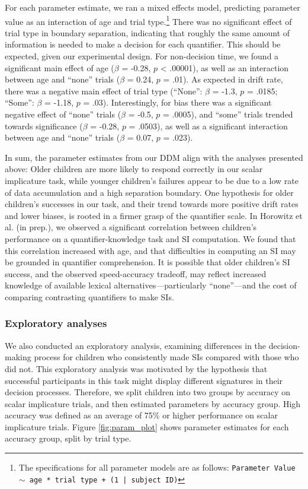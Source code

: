 \documentclass[10pt, letterpaper]{article}
\begin{document}
For each parameter estimate, we ran a mixed effects model, predicting
parameter value as an interaction of age and trial
type.\footnote{The specifications for all parameter models are as follows: \texttt{Parameter Value $\sim$ age * trial type + (1 | subject ID)}}
There was no significant effect of trial type in boundary separation,
indicating that roughly the same amount of information is needed to make
a decision for each quantifier. This should be expected, given our
experimental design. For non-decision time, we found a significant main
effect of age (\(\beta\) = -0.28, \(p\) \textless{} .00001), as well as
an interaction between age and ``none'' trials (\(\beta\) = 0.24, \(p\)
= .01). As expected in drift rate, there was a negative main effect of
trial type (``None'': \(\beta\) = -1.3, \(p\) = .0185; ``Some'':
\(\beta\) = -1.18, \(p\) = .03). Interestingly, for bias there was a
significant negative effect of ``none'' trials (\(\beta\) = -0.5, \(p\)
= .0005), and ``some'' trials trended towards significance (\(\beta\) =
-0.28, \(p\) = .0503), as well as a significant interaction between age
and ``none'' trials (\(\beta\) = 0.07, \(p\) = .023).

In sum, the parameter estimates from our DDM align with the analyses
presented above: Older children are more likely to respond correctly in
our scalar implicature task, while younger children's failures appear to
be due to a low rate of data accumulation and a high separation
boundary. One hypothesis for older children's successes in our task, and
their trend towards more positive drift rates and lower biases, is
rooted in a firmer grasp of the quantifier scale. In Horowitz et al. (in
prep.), we observed a significant correlation between children's
performance on a quantifier-knowledge task and SI computation. We found
that this correlation increased with age, and that difficulties in
computing an SI may be grounded in quantifier comprehension. It is
possible that older children's SI success, and the observed
speed-accuracy tradeoff, may reflect increased knowledge of available
lexical alternatives---particularly ``none''---and the cost of comparing
contrasting quantifiers to make SIs.

\subsubsection{Exploratory analyses}\label{exploratory-analyses}

We also conducted an exploratory analysis, examining differences in the
decision-making process for children who consistently made SIs compared
with those who did not. This exploratory analysis was motivated by the
hypothesis that successful participants in this task might display
different signatures in their decision processes. Therefore, we split
children into two groups by accuracy on scalar implicature trials, and
then estimated parameters by accuracy group. High accuracy was defined
as an average of 75\% or higher performance on scalar implicature
trials. Figure \ref{fig:param_plot} shows parameter estimates for each
accuracy group, split by trial type.
\end{document}
